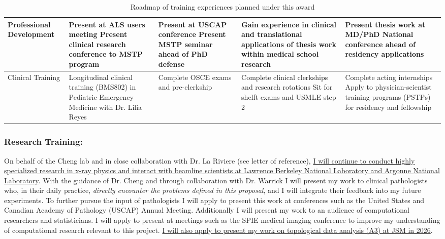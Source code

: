 \documentclass{NIHGrant}
\begin{document}
\begin{table}[h]
\begin{tabularx}{\textwidth}{|l|>{\centering\arraybackslash}X|>{\centering\arraybackslash}X|>{\centering\arraybackslash}X|>{\centering\arraybackslash}X|}
\hline
    Professional Development &
    Present at ALS users meeting
    Present clinical research conference to MSTP program &
    Present at USCAP conference \newline
    Present MSTP seminar ahead of PhD defense&
    Gain experience in clinical and translational applications of thesis work within medical school research &
    Present thesis work at MD/PhD National conference ahead of residency applications \\
    \hline
    Clinical Training &
    Longitudinal clinical training (BMS802) in Pediatric Emergency Medicine with Dr. Lilia Reyes &
    Complete OSCE exams and pre-clerkship &
    Complete clinical clerkships and research rotations \newline
    Sit for shelft exams and USMLE step 2 &
    Complete acting internships \newline Apply to physician-scientist training programs (PSTPs) for residency and fellowship\\
  \hline
\end{tabularx}
\caption{Roadmap of training experiences planned under this award}
\label{tab:goals}
\end{table}

\subsubsection*{Research Training: }
 On behalf of the Cheng lab and in close collaboration with Dr. La Riviere (see letter of reference), \uline{I will continue to conduct highly specialized research in x-ray physics and interact with beamline scientists at Lawrence Berkeley National Laboratory and Argonne National Laboratory}. With the guidance of Dr. Cheng and through collaboration with Dr. Warrick I will present my work to clinical pathologists who, in their daily practice, \emph{directly encounter the problems defined in this proposal}, and I will integrate their feedback into my future experiments. To further pursue the input of pathologists I will apply to present this work at conferences such as the United States and Canadian Academy of Pathology (USCAP) Annual Meeting. Additionally I will present my work to an audience of computational researchers and statisticians. I will apply to present at meetings such as the SPIE medical imaging conference to improve my understanding of computational research relevant to this project. \uline{I will also apply to present my work on topological data analysis (A3) at JSM in 2026}.
\end{document}
